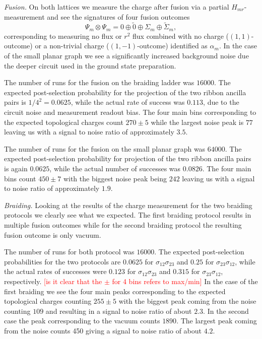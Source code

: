 \documentclass[two column]{article}
\newcommand{\caro}[1]{\textcolor{red}{[#1]}}
\begin{document}
\emph{Fusion.} 
On both lattices we measure the charge after fusion via a partial $H_{mr}$-measurement and see the signatures of four fusion outcomes
$$\Psi_m \otimes \Psi_m = 0 \oplus \tilde 0 \oplus \Sigma_m \oplus \tilde{\Sigma}_m,$$
corresponding to measuring no flux or $r^2$ flux combined with no charge ($(1,1)$-outcome) or a non-trivial charge ($(1,-1)$-outcome) identified as $\alpha_m$.
In the case of the small planar graph we see a significantly 
increased background noise due the deeper circuit used in the ground state preparation.

The number of runs for the fusion on the braiding ladder was $16000$. The expected post-selection probability for the projection of the two ribbon ancilla pairs is $1/4^2=0.0625$, while the actual rate of success was $0.113$, due to the circuit noise and measurement readout bias. The four main bins corresponding to the expected topological charges count $270\pm5$ while the largest noise peak is $77$ leaving us with a signal to noise ratio of approximately $3.5$. 

The number of runs for the fusion on the small planar graph was $64000$. The expected post-selection probability for projection of the two ribbon ancilla pairs is again $0.0625$, while the actual number of successes was $0.0826$. The four main bins count $450\pm7$ with the biggest noise peak being $242$ leaving us with a signal to noise ratio of approximately $1.9$.

\emph{Braiding.}
Looking at the results of the charge measurement for the two braiding protocols we clearly see what we expected. The first braiding protocol results in multiple fusion outcomes while for the second braiding protocol the resulting fusion outcome is only vacuum.


The number of runs for both protocol was $16000$. The expected post-selection probabilities for the two protocols are $0.0625$ for $\sigma_{12}\sigma_{23}$ and $0.25$ for $\sigma_{23}\sigma_{12}$, while the actual rates of successes were $0.123$ for $\sigma_{12}\sigma_{23}$ and $0.315$ for $\sigma_{23}\sigma_{12}$, respectively.
\caro{is it clear that the $\pm$ for 4 bins refers to max/min}
In the case of the first braiding we see the four main peaks corresponding to the expected topological charges counting $255\pm 5$ with the biggest peak coming from the noise counting $109$ and resulting in a signal to noise ratio of about $2.3$. In the second case the peak corresponding to the vacuum counts $1890$. The largest peak coming from the noise counts 450 giving a signal to noise ratio of about $4.2$.
\end{document}
